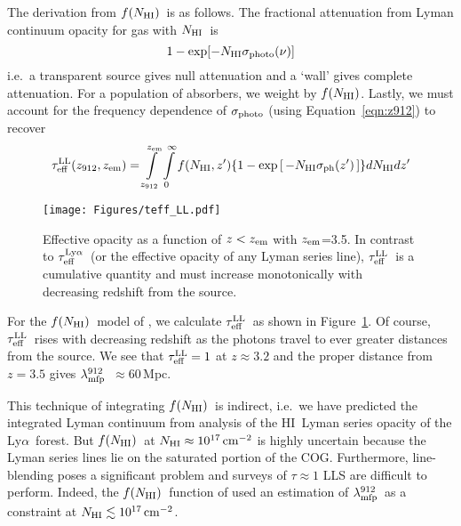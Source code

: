 \documentclass[graybox]{svmult}
\newcommand{\HI}{H{\sc I}}
\def\lya{Ly$\alpha$}
\def\ltk{\left [ \,}
\def\rtk{\, \right  ] }
\def\intl{\int\limits}
\newcommand{\mnhi}{N_{\rm HI}}
\newcommand{\nhi}{$\mnhi$}
\def\cm#1{\, {\rm cm^{#1}}}
\def\mfnhi{f(\mnhi)}
\def\fnhi{$\mfnhi$}
\def\mlmfp{\lambda_{\rm mfp}^{912}}
\def\lmfp{$\mlmfp$}
\def\mtll{\tau_{\rm eff}^{\rm LL}}
\def\tll{$\mtll$}
\def\mzem{z_{\rm em}}
\def\zem{$\mzem$}
\def\mtlya{\tau_{\rm eff}^{\rm Ly\alpha}}
\def\tlya{$\mtlya$}
\begin{document}
The derivation from \fnhi\ is as follows.
The fractional attenuation from Lyman continuum opacity
for gas with \nhi\ is
\begin{equation}
1 - \exp [-\mnhi \sigma_{\rm photo}(\nu)]
\end{equation}
i.e.\ a transparent source gives null attenuation and 
a `wall' gives complete attenuation.
For a population of absorbers, we weight by 
\fnhi. Lastly, we 
must account for the frequency dependence of $\sigma_{\rm photo}$
(using Equation~\ref{eqn:z912}) to recover
\begin{equation}
\mtll(z_{912},z_{\rm em}) = \intl_{z_{912}}^{z_{\rm em}} \intl_0^\infty f(\mnhi,z')
   \lbrace 1 - \exp \ltk - \mnhi \sigma_{\rm ph}(z') \rtk \rbrace d\mnhi dz' 
\label{eqn:teff}
\end{equation}

%
\begin{figure}[ht]
\sidecaption
\texttt{[image: Figures/teff\_LL.pdf]}
%
%
\caption{Effective opacity as a function of $z<\mzem$
with \zem=3.5.  In contrast to \tlya\ (or the effective
opacity of any Lyman series line), \tll\ is a cumulative
quantity and must increase monotonically with decreasing
redshift from the source. 
}
\label{fig:teff_LL}       %
\end{figure}

For the \fnhi\ model of \cite{pro+14}, we calculate \tll\
as shown in Figure~\ref{fig:teff_LL}.
Of course, \tll\ rises with decreasing redshift as the photons
travel to ever greater distances from the source.
We see that $\mtll = 1$ at $z \approx 3.2$ and the proper
distance from $z=3.5$ gives \lmfp~$\approx 60$\,Mpc.

This technique of integrating \fnhi\ is indirect, i.e.\ we
have predicted the integrated Lyman continuum from
analysis of the \HI\ Lyman series opacity of the \lya\ forest.
But \fnhi\ at $\mnhi \approx 10^{17} \cm{-2}$ is highly uncertain
because the Lyman series lines lie
on the saturated portion of the COG.  Furthermore, 
line-blending poses a significant problem and 
surveys of $\tau \approx 1$ LLS are difficult to perform.
Indeed, the \fnhi\ function of \cite{pro+14} used an estimation
of \lmfp\ as a constraint at $\mnhi \lesssim 10^{17} \cm{-2}$. 
\end{document}
